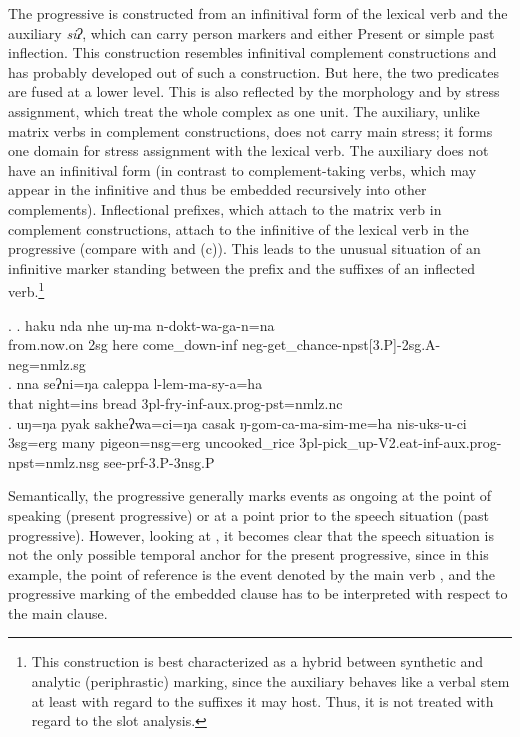 The  progressive is constructed from an infinitival form of the lexical verb and the auxiliary \emph{siʔ}, which can carry person markers and  either Present or  simple past inflection. This construction resembles infinitival complement constructions and has probably developed out of such a construction. But here, the two predicates are fused at a lower level. This is also reflected by the morphology and by stress assignment, which treat the whole complex as one unit. The auxiliary, unlike matrix verbs in complement constructions, does not carry main stress; it forms one domain for stress assignment with the lexical verb. The auxiliary does not have an infinitival form (in contrast to complement-taking verbs, which may appear in the infinitive and thus be embedded recursively into other complements). Inflectional prefixes, which attach to the matrix verb in complement constructions, attach to the infinitive of the lexical verb in the progressive (compare \Next[a] with \Next[b] and (c)). This leads to the unusual situation of an infinitive marker standing between the prefix and the suffixes of an inflected verb.\footnote{This construction is best characterized as a hybrid between synthetic and analytic (periphrastic) marking, since the auxiliary behaves like a verbal stem at least with regard to the suffixes it may host. Thus, it is not treated with regard to the slot analysis.} 


\ex. \ag. haku nda nhe uŋ-ma n-dokt-wa-ga-n=na\\
		from.now.on {\sc 2sg} here come\_down{\sc -inf} {\sc neg-}get\_chance{\sc -npst[3.P]-2sg.A-neg=nmlz.sg}	\\
	 
 	\bg. nna  seʔni=ŋa       caleppa l-lem-ma-sy-a=ha\\ 
		that night{\sc =ins} bread {\sc 3pl-}fry{\sc -inf-aux.prog-pst=nmlz.nc}\\
	  
	\bg. uŋ=ŋa   pyak sakheʔwa=ci=ŋa     casak ŋ-gom-ca-ma-sim-me=ha nis-uks-u-ci\\
 {\sc 3sg=erg} many  pigeon{\sc =nsg=erg} uncooked\_rice  {\sc 3pl}-pick\_up{\sc -V2.eat-inf-aux.prog-npst=nmlz.nsg} see{\sc [3sg.A]-prf-3.P-3nsg.P}\\
 



Semantically, the progressive generally marks events as ongoing at the point of speaking (present progressive) or at a point prior to the speech situation (past progressive). However, looking at \Last[c], it becomes clear that the speech situation is not the only possible temporal anchor for the present progressive, since in this example, the  point of reference is the event denoted by the main verb , and the progressive marking of the embedded clause has to be interpreted with respect to the main clause.


